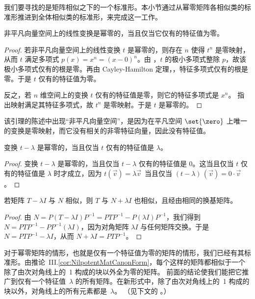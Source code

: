 我们要寻找的是矩阵相似之下的一个标准形。本小节通过从幂零矩阵各相似类的标准形推进到全体相似类的标准形，来完成这一工作。

\begin{lemma} \label{le:NilIffOnlyEigenZero}
非平凡向量空间上的线性变换是幂零的，当且仅当它仅有的特征值为零。
\end{lemma}

\begin{proof}
若非平凡向量空间上的线性变换 $t$ 是幂零的，则存在 $n$ 使得 $t^n$ 是零映射，从而 $t$ 满足多项式 $p(x)=x^n=(x-0)^n$。由 ，$t$ 的极小多项式整除 $p$，故该极小多项式仅有的根是零。再由 Cayley-Hamilton 定理，，特征多项式仅有的根是零。于是 $t$ 仅有的特征值为零。

反之，若 \( n \) 维空间上的变换 \( t \) 仅有的特征值是零，则它的特征多项式是 \( x^n \)。 指出映射满足其特征多项式，故 \( t^n \) 是零映射。于是 $t$ 是幂零的。
\end{proof}

\noindent 该引理的陈述中出现“非平凡向量空间”，是因为在平凡空间 $\set{\zero}$ 上唯一的变换是零映射，而它没有相关的非零特征向量，因此没有特征值。

\begin{corollary} \label{cor:tMinLambdaNilpotent}
变换 $t-\lambda$ 是幂零的，当且仅当 $t$ 仅有的特征值是 $\lambda$。
\end{corollary}

\begin{proof}
变换 \( t-\lambda \) 是幂零的，当且仅当 $t-\lambda$ 仅有的特征值是 \( 0 \)。这当且仅当 $t$ 仅有的特征值是 $\lambda$ 时才成立，因为 \( t(\vec{v})=\lambda\vec{v} \,\) 当且仅当 \( (t-\lambda)\,(\vec{v})=0\cdot\vec{v} \)。
\end{proof}

\begin{lemma}   \label{le:SimRespAddScalar}
若矩阵 \( T-\lambda I \) 与 \( N \) 相似，则 \( T \) 与 \( N+\lambda I \) 也相似，且经由相同的换基矩阵。
\end{lemma}

\begin{proof}
由 \( N=P(T-\lambda I)P^{-1}=PTP^{-1}-P(\lambda I)P^{-1} \)，我们得到 $N=PTP^{-1}-PP^{-1}(\lambda I)$，因为对角矩阵 \( \lambda I \) 与任何矩阵交换。于是 \( N=PTP^{-1}-\lambda I \)，从而 \( N+\lambda I=PTP^{-1} \)。
\end{proof}
对于幂零矩阵的情形，也就是仅有一个特征值为零的矩阵的情形，我们已经有其标准形。由推论~III.\ref{cor:NilpotentMatCanonForm}，每个这样的矩阵都相似于一个除了由次对角线上的~1 构成的块以外全为零的矩阵。
前面的结论使我们能把它推广到仅有一个特征值~$\lambda$ 的所有矩阵。在新形式中，除了由次对角线上的~1 构成的块以外，对角线上的所有元素都是~$\lambda$。
（见下文的 。）

